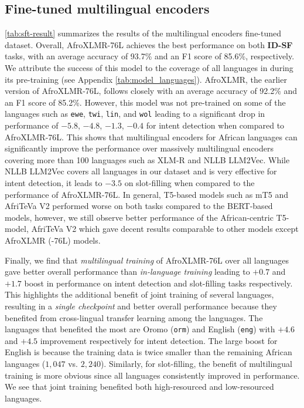 \subsection{Fine-tuned multilingual encoders}
\autoref{tab:sft-result} summarizes the results of the multilingual encoders fine-tuned \dataset{} dataset. Overall, AfroXLMR-76L achieves the best performance on both \textbf{ID-SF} tasks, with an average accuracy of 93.7\% and an F1 score of 85.6\%, respectively. We attribute the success of this model to the coverage of all languages in \dataset{} during its pre-training (see Appendix \autoref{tab:model_languages}). AfroXLMR, the earlier version of AfroXLMR-76L, follows closely with an average accuracy of 92.2\% and an F1 score of 85.2\%. However, this model was not pre-trained on some of the languages such as \texttt{ewe}, \texttt{twi}, \texttt{lin}, and \texttt{wol} leading to a significant drop in performance of $-5.8$, $-4.8$, $-1.3$, $-0.4$ for intent detection when compared to AfroXLMR-76L. This shows that multilingual encoders for African languages can significantly improve the performance over massively multilingual encoders covering more than 100 languages such as XLM-R and NLLB LLM2Vec. While NLLB LLM2Vec covers all languages in our dataset and is very effective for intent detection, it leads to $-3.5$ on slot-filling when compared to the performance of AfroXLMR-76L. In general, T5-based models such as mT5 and AfriTeVa V2 performed worse on both tasks compared to the BERT-based models, however, we still observe better performance of the African-centric T5-model, AfriTeVa V2 which gave decent results comparable to other models except AfroXLMR (-76L) models. 

Finally, we find that \textit{multilingual training} of AfroXLMR-76L over all languages gave better overall performance than \textit{in-language training} leading to $+0.7$ and $+1.7$ boost in performance on intent detection and slot-filling tasks respectively. This highlights the additional benefit of joint training of several languages, resulting in a \textit{single checkpoint} and better overall performance because they benefited from cross-lingual transfer learning among the languages. The languages that benefited the most are Oromo (\texttt{orm}) and English (\texttt{eng}) with $+4.6$ and $+4.5$ improvement respectively for intent detection. The large boost for English is because the training data is twice smaller than the remaining African languages ($1,047$ vs. $2,240$). Similarly, for slot-filling, the benefit of multilingual training is more obvious since all languages consistently improved in performance. We see that joint training benefited both high-resourced and low-resourced languages. 

